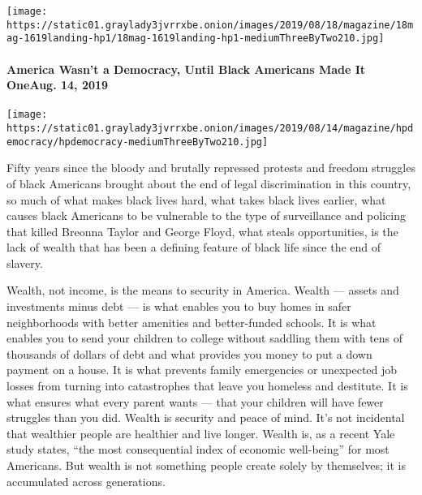 \texttt{[image: https://static01.graylady3jvrrxbe.onion/images/2019/08/18/magazine/18mag-1619landing-hp1/18mag-1619landing-hp1-mediumThreeByTwo210.jpg]}
\href{https://www.nytimes3xbfgragh.onion/interactive/2019/08/14/magazine/black-history-american-democracy.html}{}

\hypertarget{america-wasnt-a-democracy-until-black-americans-made-it-oneaug-14-2019}{%
\paragraph{America Wasn't a Democracy, Until Black Americans Made It
OneAug. 14,
2019}\label{america-wasnt-a-democracy-until-black-americans-made-it-oneaug-14-2019}}

\texttt{[image: https://static01.graylady3jvrrxbe.onion/images/2019/08/14/magazine/hpdemocracy/hpdemocracy-mediumThreeByTwo210.jpg]}

Fifty years since the bloody and brutally repressed protests and freedom
struggles of black Americans brought about the end of legal
discrimination in this country, so much of what makes black lives hard,
what takes black lives earlier, what causes black Americans to be
vulnerable to the type of surveillance and policing that killed Breonna
Taylor and George Floyd, what steals opportunities, is the lack of
wealth that has been a defining feature of black life since the end of
slavery.

Wealth, not income, is the means to security in America. Wealth ---
assets and investments minus debt --- is what enables you to buy homes
in safer neighborhoods with better amenities and better-funded schools.
It is what enables you to send your children to college without saddling
them with tens of thousands of dollars of debt and what provides you
money to put a down payment on a house. It is what prevents family
emergencies or unexpected job losses from turning into catastrophes that
leave you homeless and destitute. It is what ensures what every parent
wants --- that your children will have fewer struggles than you did.
Wealth is security and peace of mind. It's not incidental that wealthier
people are healthier and live longer. Wealth is, as a recent Yale study
states, ``the most consequential index of economic well-being'' for most
Americans. But wealth is not something people create solely by
themselves; it is accumulated across generations.

